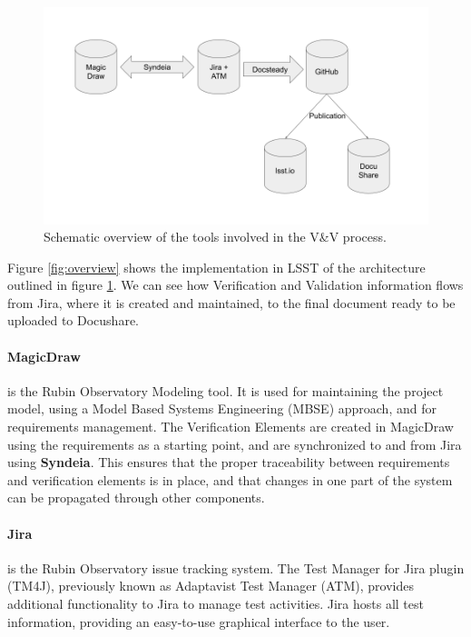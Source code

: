 \begin{figure}
\begin{center}
\includegraphics[width=\textwidth]{imgs/VandVtools.png}
 \caption{Schematic overview of the tools involved in the V\&V process.}
 \label{fig:vandvtools}
\end{center}
\end{figure}

Figure \ref{fig:overview} shows the implementation in LSST of the architecture outlined in figure \ref{fig:vandvtools}.
We can see how Verification and Validation information flows from Jira, where it is created and maintained,
to the final document ready to be uploaded to Docushare. 


\paragraph{MagicDraw}
is the Rubin Observatory Modeling tool. It is used for maintaining the project model,
using a Model Based Systems Engineering (MBSE) approach, and for requirements management.
The Verification Elements are created in MagicDraw using the requirements as a starting point,
and are synchronized to and from Jira using \textbf{Syndeia}.
This ensures that the proper traceability between requirements and verification elements is in place,
and that changes in one part of the system can be propagated through other components.

\paragraph{Jira}
is the Rubin Observatory issue tracking system.
The Test Manager for Jira plugin (TM4J), previously known as Adaptavist Test Manager (ATM),
provides additional functionality to Jira to manage test activities.
Jira hosts all test information, providing an easy-to-use graphical interface to the user.

